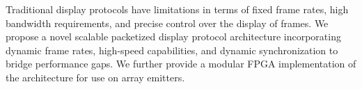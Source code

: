 Traditional display protocols have limitations in terms of fixed frame rates, high bandwidth requirements, and precise control over the display of frames. We propose a novel scalable packetized display protocol architecture incorporating dynamic frame rates, high-speed capabilities, and dynamic synchronization to bridge performance gaps. We further provide a modular FPGA implementation of the architecture for use on array emitters.
